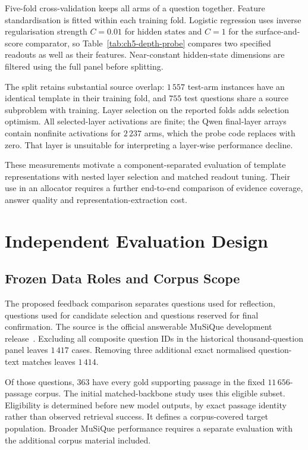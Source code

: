 Five-fold cross-validation keeps all arms of a question together. Feature
standardisation is fitted within each training fold. Logistic regression
uses inverse regularisation strength $C=0.01$ for hidden states and $C=1$
for the surface-and-score comparator, so Table~\ref{tab:ch5-depth-probe}
compares two specified readouts as well as their features. Near-constant
hidden-state dimensions are filtered using the full panel before splitting.

The split retains substantial source overlap: $1\,557$ test-arm instances
have an identical template in their training fold, and $755$ test questions
share a source subproblem with training. Layer selection on the reported
folds adds selection optimism. All selected-layer activations are finite;
the Qwen final-layer arrays contain nonfinite activations for $2\,237$ arms,
which the probe code replaces with zero. That layer is unsuitable for
interpreting a layer-wise performance decline.

These measurements motivate a component-separated evaluation of template
representations with nested layer selection and matched readout tuning.
Their use in an allocator requires a further end-to-end comparison of
evidence coverage, answer quality and representation-extraction cost.

\section{Independent Evaluation Design}
\label{sec:ch5-prospective}

\subsection{Frozen Data Roles and Corpus Scope}

The proposed feedback comparison separates questions used for reflection, questions used
for candidate selection and questions reserved for final confirmation.
The source is the official answerable MuSiQue development
release~\cite{trivedi2022musique}. Excluding all composite question IDs in the
historical thousand-question panel leaves $1\,417$ cases. Removing three
additional exact normalised question-text matches leaves $1\,414$.

Of those questions, $363$ have every gold supporting passage in the fixed
$11\,656$-passage corpus. The initial matched-backbone study uses this
eligible subset. Eligibility is determined before new model outputs, by exact
passage identity rather than observed retrieval success. It defines a
corpus-covered target population. Broader MuSiQue performance requires a
separate evaluation with the additional corpus material included.

